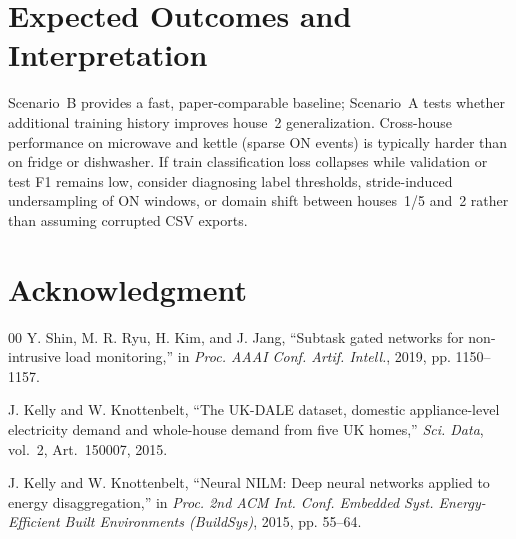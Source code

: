 \documentclass[conference]{IEEEtran}
\begin{document}
\section{Expected Outcomes and Interpretation}
Scenario~B provides a fast, paper-comparable baseline; Scenario~A tests whether additional training history improves house~2 generalization.
Cross-house performance on microwave and kettle (sparse ON events) is typically harder than on fridge or dishwasher.
If train classification loss collapses while validation or test F1 remains low, consider diagnosing label thresholds, stride-induced undersampling of ON windows, or domain shift between houses~1/5 and~2 rather than assuming corrupted CSV exports.

\section*{Acknowledgment}

\begin{thebibliography}{00}
Y. Shin, M. R. Ryu, H. Kim, and J. Jang,
``Subtask gated networks for non-intrusive load monitoring,''
in \textit{Proc. AAAI Conf. Artif. Intell.}, 2019, pp. 1150--1157.

J. Kelly and W. Knottenbelt,
``The UK-DALE dataset, domestic appliance-level electricity demand and whole-house demand from five UK homes,''
\textit{Sci. Data}, vol.~2, Art.~150007, 2015.

J. Kelly and W. Knottenbelt,
``Neural NILM: Deep neural networks applied to energy disaggregation,''
in \textit{Proc. 2nd ACM Int. Conf. Embedded Syst. Energy-Efficient Built Environments (BuildSys)}, 2015, pp. 55--64.
\end{thebibliography}
\end{document}
